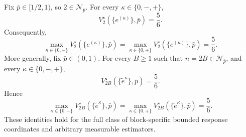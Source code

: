 Fix \(\bar p\in[1/2,1)\), so \(2\in\mathcal N_{\bar p}\). For every \(\kappa\in\{0,-,+\}\),
\[
 V_2^\star(\{e^{(\kappa)}\},\bar p)=\frac56.
\]
Consequently,
\[
 \max_{\kappa\in\{0,-\}}V_2^\star(\{e^{(\kappa)}\},\bar p)
 =\max_{\kappa\in\{0,+\}}V_2^\star(\{e^{(\kappa)}\},\bar p)
 =\frac56.
\]
More generally, fix \(\bar p\in(0,1)\). For every \(B\ge1\) such that \(n=2B\in\mathcal N_{\bar p}\), and every \(\kappa\in\{0,-,+\}\),
\[
 V_{2B}^\star(\{\widetilde e^\kappa\},\bar p)=\frac56.
\]
Hence
\[
 \max_{\kappa\in\{0,-\}}V_{2B}^\star(\{\widetilde e^\kappa\},\bar p)
 =\max_{\kappa\in\{0,+\}}V_{2B}^\star(\{\widetilde e^\kappa\},\bar p)
 =\frac56.
\]
These identities hold for the full class of block-specific bounded response coordinates and arbitrary measurable estimators.